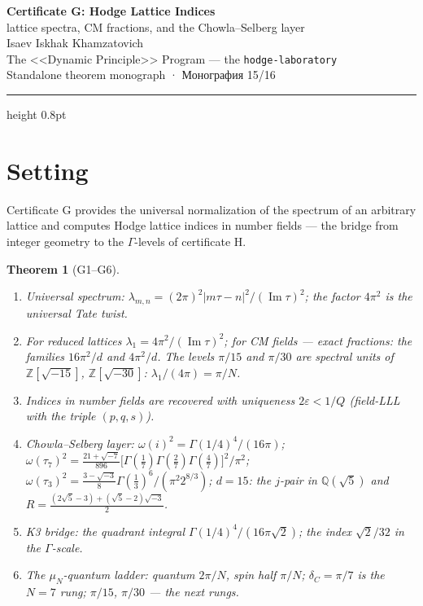 \documentclass[11pt,a4paper]{article}
\theoremstyle{plain}
\newtheorem{theorem}{Theorem}
\theoremstyle{definition}
\theoremstyle{remark}
\newcommand{\ZZ}{\mathbb{Z}}
\newcommand{\QQ}{\mathbb{Q}}
\newcommand{\Ga}{\Gamma}
\newcommand{\im}{\operatorname{Im}}
\begin{document}
\begin{center}
{\LARGE\bfseries Certificate G: Hodge Lattice Indices}\\[0.4em]
{\large lattice spectra, CM fractions, and the Chowla–Selberg layer}\\[0.6em]
{\normalsize Isaev Iskhak Khamzatovich}\\[0.2em]
{\normalsize The <<Dynamic Principle>> Program --- the \texttt{hodge-laboratory}}\\[0.15em]
{\small Standalone theorem monograph · Монография 15/16}
\end{center}
\vspace{0.4em}
{\color{linkblue}\hrule height 0.8pt}
\vspace{0.8em}

\section{Setting}

Certificate G provides the universal normalization of the spectrum
of an arbitrary lattice and computes Hodge lattice indices in
number fields --- the bridge from integer geometry to the
$\Ga$-levels of certificate H.

\begin{theorem}[G1--G6]\label{th:Gstand}
\begin{enumerate}[leftmargin=2em]
\item[(G1)] Universal spectrum:
$\lambda_{m,n}=(2\pi)^2|m\tau-n|^2/(\im\tau)^2$; the factor
$4\pi^2$ is the universal Tate twist.
\item[(G2)] For reduced lattices $\lambda_1=4\pi^2/(\im\tau)^2$;
for CM fields --- exact fractions: the families $16\pi^2/d$ and
$4\pi^2/d$. The levels $\pi/15$ and $\pi/30$ are spectral units of
$\ZZ[\sqrt{-15}]$, $\ZZ[\sqrt{-30}]$: $\lambda_1/(4\pi)=\pi/N$.
\item[(G3)] Indices in number fields are recovered with uniqueness
$2\varepsilon<1/Q$ (field-LLL with the triple $(p,q,s)$).
\item[(G4)] Chowla--Selberg layer: $\omega(i)^2=\Ga(1/4)^4/(16\pi)$;
$\omega(\tau_7)^2=\frac{21+\sqrt{-7}}{896}
\bigl[\Ga(\frac17)\Ga(\frac27)\Ga(\frac47)\bigr]^2/\pi^2$;
$\omega(\tau_3)^2=\frac{3-\sqrt{-3}}8
\Ga(\frac13)^6/(\pi^2 2^{8/3})$; $d=15$: the $j$-pair in
$\QQ(\sqrt5)$ and $R=\frac{(2\sqrt5-3)+(\sqrt5-2)\sqrt{-3}}2$.
\item[(G5)] K3 bridge: the quadrant integral
$\Ga(1/4)^4/(16\pi\sqrt2)$; the index $\sqrt2/32$ in the
$\Ga$-scale.
\item[(G6)] The $\mu_N$-quantum ladder: quantum $2\pi/N$, spin half
$\pi/N$; $\delta_C=\pi/7$ is the $N=7$ rung; $\pi/15$, $\pi/30$ ---
the next rungs.
\end{enumerate}
\end{theorem}
\end{document}
